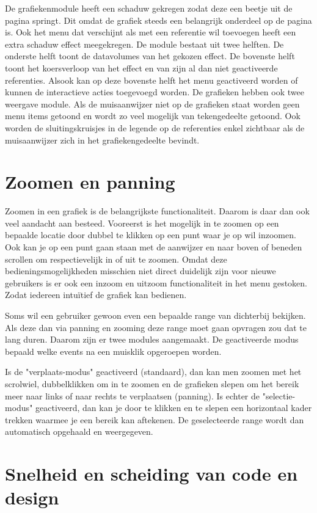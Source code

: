 De grafiekenmodule heeft een schaduw gekregen zodat deze een beetje uit de pagina springt. Dit omdat de grafiek steeds een belangrijk onderdeel op de pagina is. Ook het menu dat verschijnt als met een referentie wil toevoegen heeft een extra schaduw effect meegekregen. De module bestaat uit twee helften. De onderste helft toont de datavolumes van het gekozen effect. De bovenste helft toont het koersverloop van het effect en van zijn al dan niet geactiveerde referenties. Alsook kan op deze bovenste helft het menu geactiveerd worden of kunnen de interactieve acties toegevoegd worden. De grafieken hebben ook twee weergave module. Als de muisaanwijzer niet op de grafieken staat worden geen menu items getoond en wordt zo veel mogelijk van tekengedeelte getoond. Ook worden de sluitingskruisjes in de legende op de referenties enkel zichtbaar als de muisaanwijzer zich in het grafiekengedeelte bevindt.

\section{Zoomen en panning}

Zoomen in een grafiek is de belangrijkste functionaliteit. Daarom is daar dan ook veel aandacht aan besteed. Vooreerst is het mogelijk in te zoomen op een bepaalde locatie door dubbel te klikken op een punt waar je op wil inzoomen. Ook kan je op een punt gaan staan met de aanwijzer en naar boven of beneden scrollen om respectievelijk in of uit te zoomen. Omdat deze bedieningsmogelijkheden misschien niet direct duidelijk zijn voor nieuwe gebruikers is er ook een inzoom en uitzoom functionaliteit in het menu gestoken. Zodat iedereen intu\"itief de grafiek kan bedienen.

Soms wil een gebruiker gewoon even een bepaalde range van dichterbij bekijken. Als deze dan via panning en zooming deze range moet gaan opvragen zou dat te lang duren. Daarom zijn er twee modules aangemaakt. De geactiveerde modus bepaald welke events na een muisklik opgeroepen worden.

Is de "verplaats-modus" geactiveerd (standaard), dan kan men zoomen met het scrolwiel, dubbelklikken om in te zoomen en de grafieken slepen om het bereik meer naar links of naar rechts te verplaatsen (panning). Is echter de "selectie-modus" geactiveerd, dan kan je door te klikken en te slepen een horizontaal kader trekken waarmee je een bereik kan aftekenen. De geselecteerde range wordt dan automatisch opgehaald en weergegeven.

\section{Snelheid en scheiding van code en design}

